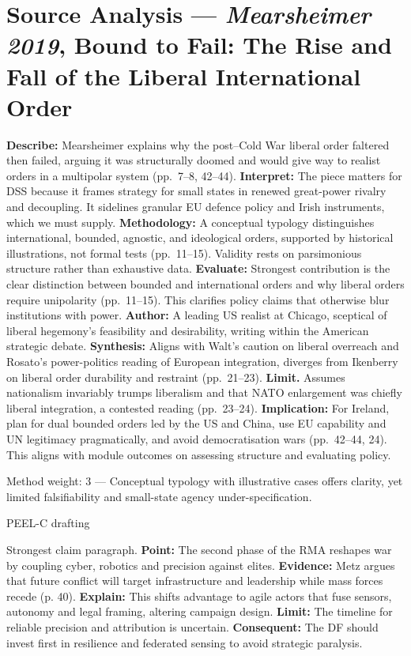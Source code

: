 \section*{Source Analysis — \textit{Mearsheimer 2019}, Bound to Fail: The Rise and Fall of the Liberal International Order}  
\textbf{Describe:} Mearsheimer explains why the post–Cold War liberal order faltered then failed, arguing it was structurally doomed and would give way to realist orders in a multipolar system (pp.~7–8, 42–44).  
\textbf{Interpret:} The piece matters for DSS because it frames strategy for small states in renewed great-power rivalry and decoupling. It sidelines granular EU defence policy and Irish instruments, which we must supply.  
\textbf{Methodology:} A conceptual typology distinguishes international, bounded, agnostic, and ideological orders, supported by historical illustrations, not formal tests (pp.~11–15). Validity rests on parsimonious structure rather than exhaustive data.  
\textbf{Evaluate:} Strongest contribution is the clear distinction between bounded and international orders and why liberal orders require unipolarity (pp.~11–15). This clarifies policy claims that otherwise blur institutions with power.  
\textbf{Author:} A leading US realist at Chicago, sceptical of liberal hegemony’s feasibility and desirability, writing within the American strategic debate.  
\textbf{Synthesis:} Aligns with Walt’s caution on liberal overreach and Rosato’s power-politics reading of European integration, diverges from Ikenberry on liberal order durability and restraint (pp.~21–23).  
\textbf{Limit.} Assumes nationalism invariably trumps liberalism and that NATO enlargement was chiefly liberal integration, a contested reading (pp.~23–24).  
\textbf{Implication:} For Ireland, plan for dual bounded orders led by the US and China, use EU capability and UN legitimacy pragmatically, and avoid democratisation wars (pp.~42–44, 24). This aligns with module outcomes on assessing structure and evaluating policy.  

Method weight: 3 — Conceptual typology with illustrative cases offers clarity, yet limited falsifiability and small-state agency under-specification.  

PEEL-C drafting

Strongest claim paragraph.  
\textbf{Point:} The second phase of the RMA reshapes war by coupling cyber, robotics and precision against elites.  
\textbf{Evidence:} Metz argues that future conflict will target infrastructure and leadership while mass forces recede (p. 40).  
\textbf{Explain:} This shifts advantage to agile actors that fuse sensors, autonomy and legal framing, altering campaign design.  
\textbf{Limit:} The timeline for reliable precision and attribution is uncertain.  
\textbf{Consequent:} The DF should invest first in resilience and federated sensing to avoid strategic paralysis.  

